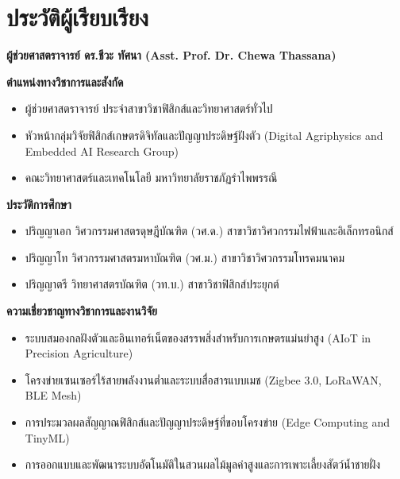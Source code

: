\chapter*{ประวัติผู้เรียบเรียง}

\noindent\textbf{ผู้ช่วยศาสตราจารย์ ดร.ชีวะ ทัศนา (Asst. Prof. Dr. Chewa Thassana)}

\vspace{0.4cm}
\noindent\textbf{ตำแหน่งทางวิชาการและสังกัด}
\begin{itemize}
    \item ผู้ช่วยศาสตราจารย์ ประจำสาขาวิชาฟิสิกส์และวิทยาศาสตร์ทั่วไป
    \item หัวหน้ากลุ่มวิจัยฟิสิกส์เกษตรดิจิทัลและปัญญาประดิษฐ์ฝังตัว (Digital Agriphysics and Embedded AI Research Group)
    \item คณะวิทยาศาสตร์และเทคโนโลยี มหาวิทยาลัยราชภัฏรำไพพรรณี
\end{itemize}

\vspace{0.3cm}
\noindent\textbf{ประวัติการศึกษา}
\begin{itemize}
    \item ปริญญาเอก \quad วิศวกรรมศาสตรดุษฎีบัณฑิต (วศ.ด.) สาขาวิชาวิศวกรรมไฟฟ้าและอิเล็กทรอนิกส์
    \item ปริญญาโท \quad วิศวกรรมศาสตรมหาบัณฑิต (วศ.ม.) สาขาวิชาวิศวกรรมโทรคมนาคม
    \item ปริญญาตรี \quad วิทยาศาสตรบัณฑิต (วท.บ.) สาขาวิชาฟิสิกส์ประยุกต์
\end{itemize}

\vspace{0.3cm}
\noindent\textbf{ความเชี่ยวชาญทางวิชาการและงานวิจัย}
\begin{itemize}
    \item ระบบสมองกลฝังตัวและอินเทอร์เน็ตของสรรพสิ่งสำหรับการเกษตรแม่นยำสูง (AIoT in Precision Agriculture)
    \item โครงข่ายเซนเซอร์ไร้สายพลังงานต่ำและระบบสื่อสารแบบเมช (Zigbee 3.0, LoRaWAN, BLE Mesh)
    \item การประมวลผลสัญญาณฟิสิกส์และปัญญาประดิษฐ์ที่ขอบโครงข่าย (Edge Computing and TinyML)
    \item การออกแบบและพัฒนาระบบอัตโนมัติในสวนผลไม้มูลค่าสูงและการเพาะเลี้ยงสัตว์น้ำชายฝั่ง
\end{itemize}

\clearpage
